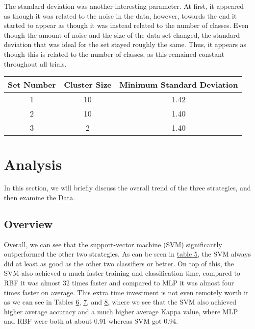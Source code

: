 \documentclass{article}
\begin{document}
		The standard deviation was another interesting parameter. At first, it appeared as though it was related to the noise in the data, however, towards the end it started to appear as though it was instead related to the number of classes. Even though the amount of noise and the size of the data set changed, the standard deviation that was ideal for the set stayed roughly the same. Thus, it appears as though this is related to the number of classes, as this remained constant throughout all trials.\\
				
		
		\begin{minipage}{\linewidth}
			\centering
			\begin{tabular}{c|cc}\label{RBF_In}
				Set Number 	& Cluster Size & Minimum Standard Deviation \\
				\hline
				1					&  10					& 1.42	  \\
				2					&  10					& 1.40	\\ 
				3					&  2					& 1.40	\\
			\end{tabular}
		\end{minipage}

\pagebreak
\section{Analysis}\label{S3}
	In this section, we will briefly discuss the overall trend of the three strategies, and then examine the \hyperref[S5]{Data}.\\
	
	\subsection{Overview}
		Overall, we can see that the support-vector machine (SVM) significantly outperformed the other two strategies. As can be seen in \hyperref[OverallRes]{table 5}, the SVM always did at least as good as the other two classifiers or better. On top of this, the SVM also achieved a much faster training and classification time, compared to RBF it was almost 32 times faster and compared to MLP it was almost four times faster on average. This extra time investment is not even remotely worth it as we can see in Tables \hyperref[MLPAcc]{6}, \hyperref[SVMAcc]{7}, and \hyperref[RBFAcc]{8}, where we see that the SVM also achieved higher average accuracy and a much higher average Kappa value, where MLP and RBF were both at about 0.91 whereas SVM got 0.94. \\
\end{document}
